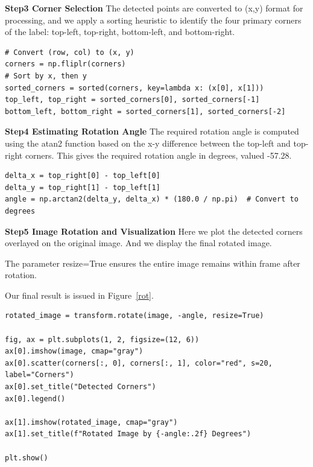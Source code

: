 \documentclass[12pt]{article}
\begin{document}
\textbf{Step3 Corner Selection}
The detected points are converted to (x,y) format for processing, and we apply a sorting heuristic  to identify the four primary corners of the label: top-left, top-right, bottom-left, and bottom-right.
\begin{lstlisting}
# Convert (row, col) to (x, y)
corners = np.fliplr(corners)   
# Sort by x, then y
sorted_corners = sorted(corners, key=lambda x: (x[0], x[1])) 
top_left, top_right = sorted_corners[0], sorted_corners[-1]
bottom_left, bottom_right = sorted_corners[1], sorted_corners[-2]
\end{lstlisting}

\textbf{Step4 Estimating Rotation Angle}
The required rotation angle is computed using the atan2 function based on the x-y difference between the top-left and top-right corners. This gives the required rotation angle in degrees, valued -57.28.

\begin{lstlisting}
delta_x = top_right[0] - top_left[0]
delta_y = top_right[1] - top_left[1]
angle = np.arctan2(delta_y, delta_x) * (180.0 / np.pi)  # Convert to degrees
\end{lstlisting}

\textbf{Step5 Image Rotation and Visualization}
Here we plot the detected corners overlayed on the original image. And we display the final rotated image.

The parameter resize=True ensures the entire image remains within frame after rotation. 

Our final result is issued in Figure~\ref{rot}.
\begin{lstlisting}
rotated_image = transform.rotate(image, -angle, resize=True)

fig, ax = plt.subplots(1, 2, figsize=(12, 6))
ax[0].imshow(image, cmap="gray")
ax[0].scatter(corners[:, 0], corners[:, 1], color="red", s=20, label="Corners")
ax[0].set_title("Detected Corners")
ax[0].legend()

ax[1].imshow(rotated_image, cmap="gray")
ax[1].set_title(f"Rotated Image by {-angle:.2f} Degrees")

plt.show()
\end{lstlisting}



\end{document}
